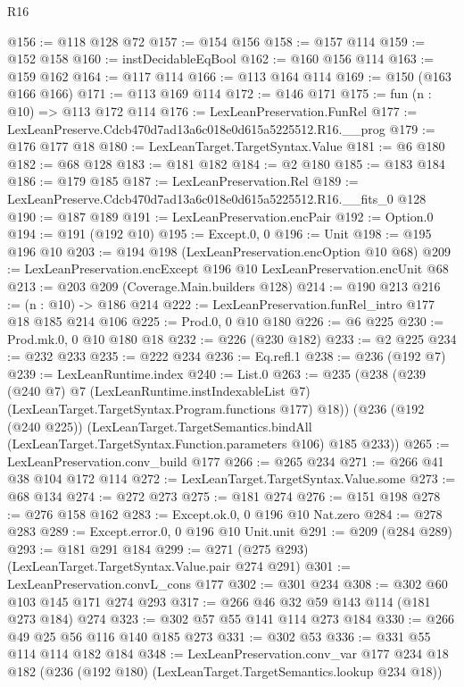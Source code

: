 \begin{lexlean}{R16}
\begin{coremodule}
@156 := @118 @128 @72
@157 := @154 @156
@158 := @157 @114
@159 := @152 @158
@160 := instDecidableEqBool
@162 := @160 @156 @114
@163 := @159 @162
@164 := @117 @114
@166 := @113 @164 @114
@169 := @150 (@163 @166 @166)
@171 := @113 @169 @114
@172 := @146 @171
@175 := fun (n : @10) => @113 @172 @114
@176 := LexLeanPreservation.FunRel
@177 := LexLeanPreserve.Cdcb470d7ad13a6c018e0d615a5225512.R16.__prog
@179 := @176 @177 @18
@180 := LexLeanTarget.TargetSyntax.Value
@181 := @6 @180
@182 := @68 @128
@183 := @181 @182
@184 := @2 @180
@185 := @183 @184
@186 := @179 @185
@187 := LexLeanPreservation.Rel
@189 := LexLeanPreserve.Cdcb470d7ad13a6c018e0d615a5225512.R16.__fits_0 @128
@190 := @187 @189
@191 := LexLeanPreservation.encPair
@192 := Option.{0}
@194 := @191 (@192 @10)
@195 := Except.{0, 0}
@196 := Unit
@198 := @195 @196 @10
@203 := @194 @198 (LexLeanPreservation.encOption @10 @68)
@209 := LexLeanPreservation.encExcept @196 @10 LexLeanPreservation.encUnit @68
@213 := @203 @209 (Coverage.Main.builders @128)
@214 := @190 @213
@216 := (n : @10) -> @186 @214
@222 := LexLeanPreservation.funRel_intro @177 @18 @185 @214 @106
@225 := Prod.{0, 0} @10 @180
@226 := @6 @225
@230 := Prod.mk.{0, 0} @10 @180 @18
@232 := @226 (@230 @182)
@233 := @2 @225
@234 := @232 @233
@235 := @222 @234
@236 := Eq.refl.{1}
@238 := @236 (@192 @7)
@239 := LexLeanRuntime.index
@240 := List.{0}
@263 := @235
    (@238
      (@239
        (@240 @7)
        @7
        (LexLeanRuntime.instIndexableList @7)
        (LexLeanTarget.TargetSyntax.Program.functions @177)
        @18))
    (@236
      (@192 (@240 @225))
      (LexLeanTarget.TargetSemantics.bindAll
        (LexLeanTarget.TargetSyntax.Function.parameters @106)
        @185
        @233))
@265 := LexLeanPreservation.conv_build @177
@266 := @265 @234
@271 := @266 @41 @38 @104 @172 @114
@272 := LexLeanTarget.TargetSyntax.Value.some
@273 := @68 @134
@274 := @272 @273
@275 := @181 @274
@276 := @151 @198
@278 := @276 @158 @162
@283 := Except.ok.{0, 0} @196 @10 Nat.zero
@284 := @278 @283
@289 := Except.error.{0, 0} @196 @10 Unit.unit
@291 := @209 (@284 @289)
@293 := @181 @291 @184
@299 := @271 (@275 @293) (LexLeanTarget.TargetSyntax.Value.pair @274 @291)
@301 := LexLeanPreservation.convL_cons @177
@302 := @301 @234
@308 := @302 @60 @103 @145 @171 @274 @293
@317 := @266 @46 @32 @59 @143 @114 (@181 @273 @184) @274
@323 := @302 @57 @55 @141 @114 @273 @184
@330 := @266 @49 @25 @56 @116 @140 @185 @273
@331 := @302 @53
@336 := @331 @55 @114 @114 @182 @184
@348 := LexLeanPreservation.conv_var
    @177
    @234
    @18
    @182
    (@236 (@192 @180) (LexLeanTarget.TargetSemantics.lookup @234 @18))

\end{coremodule}
\end{lexlean}
